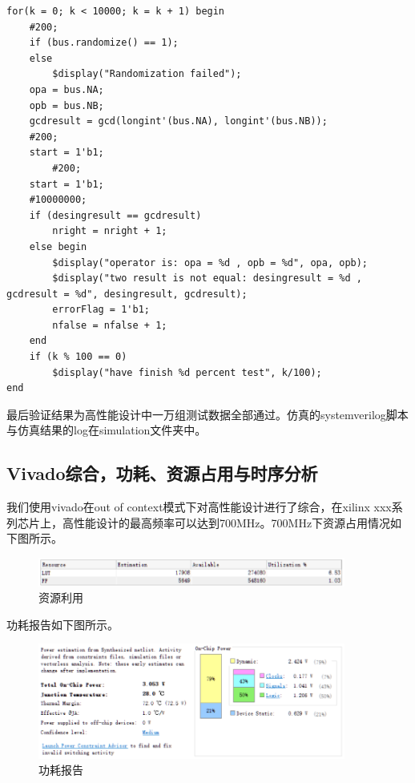 \documentclass[12pt]{article}
\begin{document}
\lstset{language=C}
\begin{lstlisting}
for(k = 0; k < 10000; k = k + 1) begin 
	#200;
	if (bus.randomize() == 1);
	else
		$display("Randomization failed");
	opa = bus.NA;
	opb = bus.NB;
	gcdresult = gcd(longint'(bus.NA), longint'(bus.NB));
	#200;
	start = 1'b1;
        #200;
	start = 1'b1;
	#10000000;
	if (desingresult == gcdresult)
		nright = nright + 1;
	else begin 
		$display("operator is: opa = %d , opb = %d", opa, opb);
		$display("two result is not equal: desingresult = %d , gcdresult = %d", desingresult, gcdresult);
		errorFlag = 1'b1;
		nfalse = nfalse + 1;
	end
	if (k % 100 == 0)
		$display("have finish %d percent test", k/100);	
end
\end{lstlisting}

最后验证结果为高性能设计中一万组测试数据全部通过。仿真的systemverilog脚本与仿真结果的log在simulation文件夹中。

\subsection{Vivado综合，功耗、资源占用与时序分析}
我们使用vivado在out of context模式下对高性能设计进行了综合，在xilinx xxx系列芯片上，高性能设计的最高频率可以达到700MHz。700MHz下资源占用情况如下图所示。

\begin{figure}[H]
\begin{center}
\includegraphics[width=0.9\textwidth]{./yhc_hp/700m_utilization.png}
\caption{资源利用}
\label{700m_utilization}
\end{center}
\end{figure}

功耗报告如下图所示。

\begin{figure}[H]
\begin{center}
\includegraphics[width=0.9\textwidth]{./yhc_hp/700m_power.png}
\caption{功耗报告}
\label{700m_power}
\end{center}
\end{figure}
\end{document}
